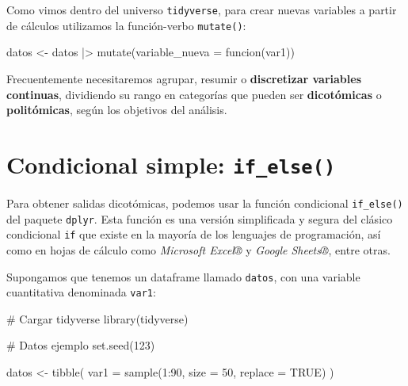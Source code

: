 \documentclass[
  spanish,
  a4paper,
]{scrbook}
\newenvironment{Shaded}{\begin{snugshade}}{\end{snugshade}}
\newcommand{\AttributeTok}[1]{\textcolor[rgb]{0.40,0.45,0.13}{#1}}
\newcommand{\CommentTok}[1]{\textcolor[rgb]{0.37,0.37,0.37}{#1}}
\newcommand{\ConstantTok}[1]{\textcolor[rgb]{0.56,0.35,0.01}{#1}}
\newcommand{\DecValTok}[1]{\textcolor[rgb]{0.68,0.00,0.00}{#1}}
\newcommand{\FunctionTok}[1]{\textcolor[rgb]{0.28,0.35,0.67}{#1}}
\newcommand{\NormalTok}[1]{\textcolor[rgb]{0.00,0.23,0.31}{#1}}
\newcommand{\OtherTok}[1]{\textcolor[rgb]{0.00,0.23,0.31}{#1}}
\newcommand{\SpecialCharTok}[1]{\textcolor[rgb]{0.37,0.37,0.37}{#1}}
\begin{document}
Como vimos dentro del universo \texttt{tidyverse}, para crear nuevas
variables a partir de cálculos utilizamos la función-verbo
\texttt{mutate()}:

\begin{Shaded}
\begin{Highlighting}[]
\NormalTok{datos }\OtherTok{\textless{}{-}}\NormalTok{ datos }\SpecialCharTok{|\textgreater{}}
  \FunctionTok{mutate}\NormalTok{(}\AttributeTok{variable\_nueva =} \FunctionTok{funcion}\NormalTok{(var1))}
\end{Highlighting}
\end{Shaded}

Frecuentemente necesitaremos agrupar, resumir o \textbf{discretizar
variables continuas}, dividiendo su rango en categorías que pueden ser
\textbf{dicotómicas} o \textbf{politómicas}, según los objetivos del
análisis.

\section{\texorpdfstring{Condicional simple:
\texttt{if\_else()}}{Condicional simple: if\_else()}}\label{condicional-simple-if_else}

Para obtener salidas dicotómicas, podemos usar la función condicional
\texttt{if\_else()} del paquete \texttt{dplyr}. Esta función es una
versión simplificada y segura del clásico condicional \texttt{if} que
existe en la mayoría de los lenguajes de programación, así como en hojas
de cálculo como \emph{Microsoft Excel®} y \emph{Google Sheets®}, entre
otras.

Supongamos que tenemos un dataframe llamado \texttt{datos}, con una
variable cuantitativa denominada \texttt{var1}:

\begin{Shaded}
\begin{Highlighting}[]
\CommentTok{\# Cargar tidyverse}
\FunctionTok{library}\NormalTok{(tidyverse)}

\CommentTok{\# Datos ejemplo}
\FunctionTok{set.seed}\NormalTok{(}\DecValTok{123}\NormalTok{)}

\NormalTok{datos }\OtherTok{\textless{}{-}} \FunctionTok{tibble}\NormalTok{(}
  \AttributeTok{var1 =} \FunctionTok{sample}\NormalTok{(}\DecValTok{1}\SpecialCharTok{:}\DecValTok{90}\NormalTok{, }\AttributeTok{size =} \DecValTok{50}\NormalTok{, }\AttributeTok{replace =} \ConstantTok{TRUE}\NormalTok{)}
\NormalTok{)}
\end{Highlighting}
\end{Shaded}
\end{document}
